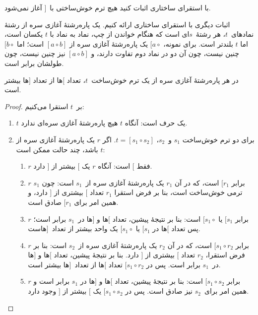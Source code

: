 \documentclass[../../../include/open-logic-section]{subfiles}
\begin{document}
\begin{prob}
  با استقرای ساختاری اثبات کنید هیچ ترم خوش‌ساختی با~$]$ آغاز نمی‌شود.
\end{prob}

اثبات دیگری با استقرای ساختاری ارائه کنیم. یک پاره‌رشتهٔ آغازی سره از
رشتهٔ نمادهای~$t$، هر رشتهٔ~$s$ای است که هنگام خواندن از چپ، نماد به
نماد با $t$ یکسان است، اما $t$ بلندتر است. برای نمونه،
$[a \circ {}$ یک پاره‌رشتهٔ آغازی سره از $[a \circ b]$ است؛ اما
$[b \circ {}$ چنین نیست، چون آن دو در نماد دوم تفاوت دارند، و
$[a \circ b]$ نیز چنین نیست، چون طولشان برابر است.

\begin{prop}
  در هر پاره‌رشتهٔ آغازی سره از یک ترم خوش‌ساخت~$t$، تعداد $[$ها از
  تعداد $]$ها بیشتر است.
\end{prop}

\begin{proof}
  بر~$t$ استقرا می‌کنیم:
  \begin{enumerate}
  \item $t$ یک حرف است: آنگاه $t$ هیچ پاره‌رشتهٔ آغازی سره‌ای ندارد.
  \item برای دو ترم خوش‌ساخت $s_1$ و~$s_2$،
    $t = [s_1 \circ s_2]$. اگر $r$ یک پاره‌رشتهٔ آغازی سره از $t$
    باشد، چند حالت ممکن است:
    \begin{enumerate}
    \item $r$ فقط $[$ است: آنگاه $r$ یک $[$ بیشتر از $]$ دارد.
    \item $r$ برابر $[r_1$ است، که در آن $r_1$ یک پاره‌رشتهٔ آغازی
      سره از~$s_1$ است: چون $s_1$ ترمی خوش‌ساخت است، بنا بر فرض
      استقرا $r_1$ تعداد $[$ بیشتری از $]$ دارد، و همین امر برای
      $[r_1$ صادق است.
    \item $r$ برابر $[s_1$ یا $[s_1 \circ {}$ است: بنا بر نتیجهٔ
      پیشین، تعداد $[$ها و $]$ها در~$s_1$ برابر است؛ پس تعداد $[$ها در
      $[s_1$ یا $[s_1 \circ {}$ یک واحد بیشتر از تعداد~$]$هاست.
    \item $r$ برابر $[s_1 \circ r_2$ است، که در آن $r_2$ یک پاره‌رشتهٔ
      آغازی سره از~$s_2$ است: بنا بر فرض استقرا، $r_2$ تعداد $[$ بیشتری
      از $]$ دارد. بنا بر نتیجهٔ پیشین، تعداد $[$ها و $]$ها در~$s_1$
      برابر است. پس در $[s_1 \circ r_2$ تعداد $[$ها از تعداد~$]$ها
      بیشتر است.
    \item $r$ برابر $[s_1 \circ s_2$ است: بنا بر نتیجهٔ پیشین، تعداد
      $[$ها و $]$ها در $s_1$ برابر است و همین امر برای~$s_2$ نیز صادق
      است. پس در $[s_1 \circ s_2$ یک $[$ بیشتر از $]$ وجود دارد.
    \end{enumerate}
  \end{enumerate}
\end{proof}
\end{document}
